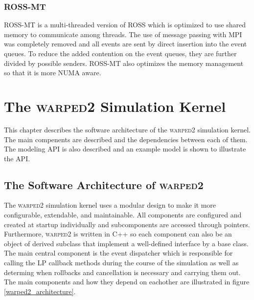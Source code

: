 \documentclass[11pt]{book}
\begin{document}
\subsection{ROSS-MT}

ROSS-MT\cite{jagtap-12} is a multi-threaded version of ROSS which is optimized to use shared
memory to communicate among threads. The use of message passing with MPI was completely
removed and all events are sent by direct insertion into the event queues. To reduce the
added contention on the event queues, they are further divided by possible senders. ROSS-MT
also optimizes the memory management so that it is more NUMA aware.



\chapter{The \textsc{warped2} Simulation Kernel}\label{warped2_overview}

This chapter describes the software architecture of the \textsc{warped2} simulation kernel.
The main compenents are described and the dependencies between each of them. The modeling API
is also described and an example model is shown to illustrate the API.

\section{The Software Architecture of \textsc{warped2}}

The \textsc{warped2} simulation kernel uses a modular design to make it more configurable,
extendable, and maintainable. All components are configured and created at startup individually
and subcomponents are accessed through pointers. Furthermore, \textsc{warped2} is written in
C++ so each component can also be an object of derived subclass that implement a well-defined
interface by a base class. The main central component is the event dispatcher which is responsible
for calling the LP callback methods during the course of the simulation as well as determing
when rollbacks and cancellation is necessary and carrying them out. The main components and
how they depend on eachother are illustrated in figure \ref{warped2_architecture}.
\end{document}
